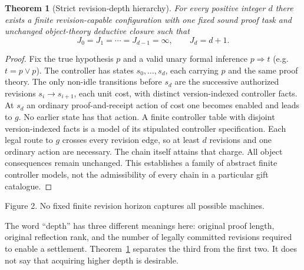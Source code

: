 \documentclass[11pt]{article}
\newtheorem{theorem}{Theorem}[section]
\theoremstyle{remark}\newtheorem{remark}[theorem]{Remark}
\begin{document}
\begin{theorem}[Strict revision-depth hierarchy]\label{thm:depth}
For every positive integer $d$ there exists a finite revision-capable configuration with one fixed sound proof task and unchanged object-theory deductive closure such that
\[
 J_0=J_1=\cdots=J_{d-1}=\infty,\qquad J_d=d+1.
\]
\end{theorem}
\begin{proof}
Fix the true hypothesis $p$ and a valid unary formal inference $p\Rightarrow t$ (e.g. $t=p\lor p$). The controller has states $s_0,\ldots,s_d$, each carrying $p$ and the same proof theory. The only non-idle transitions before $s_d$ are the successive authorized revisions $s_i\to s_{i+1}$, each unit cost, with distinct version-indexed controller facts. At $s_d$ an ordinary proof-and-receipt action of cost one becomes enabled and leads to $g$. No earlier state has that action. A finite controller table with disjoint version-indexed facts is a model of its stipulated controller specification. Each legal route to $g$ crosses every revision edge, so at least $d$ revisions and one ordinary action are necessary. The chain itself attains that charge. All object consequences remain unchanged. This establishes a family of abstract finite controller models, not the admissibility of every chain in a particular gift catalogue.
\end{proof}
\begin{center}

\small Figure 2. No fixed finite revision horizon captures all possible machines.
\end{center}
The word ``depth'' has three different meanings here: original proof length, original reflection rank, and the number of legally committed revisions required to enable a settlement. Theorem~\ref{thm:depth} separates the third from the first two. It does not say that acquiring higher depth is desirable.
\end{document}
